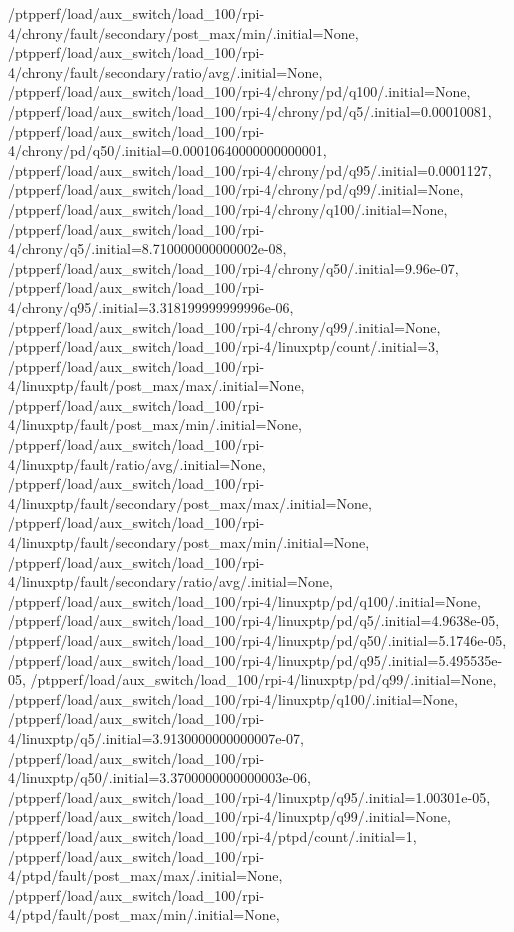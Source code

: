 {    /ptpperf/load/aux_switch/load_100/rpi-4/chrony/fault/secondary/post_max/min/.initial=None,
    /ptpperf/load/aux_switch/load_100/rpi-4/chrony/fault/secondary/ratio/avg/.initial=None,
    /ptpperf/load/aux_switch/load_100/rpi-4/chrony/pd/q100/.initial=None,
    /ptpperf/load/aux_switch/load_100/rpi-4/chrony/pd/q5/.initial=0.00010081,
    /ptpperf/load/aux_switch/load_100/rpi-4/chrony/pd/q50/.initial=0.00010640000000000001,
    /ptpperf/load/aux_switch/load_100/rpi-4/chrony/pd/q95/.initial=0.0001127,
    /ptpperf/load/aux_switch/load_100/rpi-4/chrony/pd/q99/.initial=None,
    /ptpperf/load/aux_switch/load_100/rpi-4/chrony/q100/.initial=None,
    /ptpperf/load/aux_switch/load_100/rpi-4/chrony/q5/.initial=8.710000000000002e-08,
    /ptpperf/load/aux_switch/load_100/rpi-4/chrony/q50/.initial=9.96e-07,
    /ptpperf/load/aux_switch/load_100/rpi-4/chrony/q95/.initial=3.318199999999996e-06,
    /ptpperf/load/aux_switch/load_100/rpi-4/chrony/q99/.initial=None,
    /ptpperf/load/aux_switch/load_100/rpi-4/linuxptp/count/.initial=3,
    /ptpperf/load/aux_switch/load_100/rpi-4/linuxptp/fault/post_max/max/.initial=None,
    /ptpperf/load/aux_switch/load_100/rpi-4/linuxptp/fault/post_max/min/.initial=None,
    /ptpperf/load/aux_switch/load_100/rpi-4/linuxptp/fault/ratio/avg/.initial=None,
    /ptpperf/load/aux_switch/load_100/rpi-4/linuxptp/fault/secondary/post_max/max/.initial=None,
    /ptpperf/load/aux_switch/load_100/rpi-4/linuxptp/fault/secondary/post_max/min/.initial=None,
    /ptpperf/load/aux_switch/load_100/rpi-4/linuxptp/fault/secondary/ratio/avg/.initial=None,
    /ptpperf/load/aux_switch/load_100/rpi-4/linuxptp/pd/q100/.initial=None,
    /ptpperf/load/aux_switch/load_100/rpi-4/linuxptp/pd/q5/.initial=4.9638e-05,
    /ptpperf/load/aux_switch/load_100/rpi-4/linuxptp/pd/q50/.initial=5.1746e-05,
    /ptpperf/load/aux_switch/load_100/rpi-4/linuxptp/pd/q95/.initial=5.495535e-05,
    /ptpperf/load/aux_switch/load_100/rpi-4/linuxptp/pd/q99/.initial=None,
    /ptpperf/load/aux_switch/load_100/rpi-4/linuxptp/q100/.initial=None,
    /ptpperf/load/aux_switch/load_100/rpi-4/linuxptp/q5/.initial=3.9130000000000007e-07,
    /ptpperf/load/aux_switch/load_100/rpi-4/linuxptp/q50/.initial=3.3700000000000003e-06,
    /ptpperf/load/aux_switch/load_100/rpi-4/linuxptp/q95/.initial=1.00301e-05,
    /ptpperf/load/aux_switch/load_100/rpi-4/linuxptp/q99/.initial=None,
    /ptpperf/load/aux_switch/load_100/rpi-4/ptpd/count/.initial=1,
    /ptpperf/load/aux_switch/load_100/rpi-4/ptpd/fault/post_max/max/.initial=None,
    /ptpperf/load/aux_switch/load_100/rpi-4/ptpd/fault/post_max/min/.initial=None,
}
